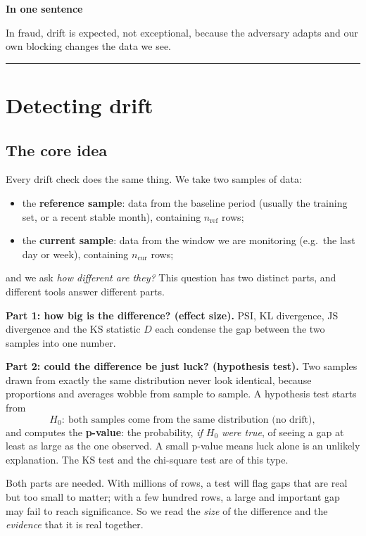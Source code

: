 \documentclass[11pt]{article}
\begin{document}
\textbf{In one sentence}

In fraud, drift is expected, not exceptional, because the adversary adapts and our own blocking changes the data we see.

\vspace{5mm}
\hrule
\vspace{5mm}

\section{Detecting drift}

\subsection{The core idea}

Every drift check does the same thing. We take two samples of data:
\begin{itemize}
    \item the \textbf{reference sample}: data from the baseline period (usually the training set, or a recent stable month), containing \(n_{\text{ref}}\) rows;
    \item the \textbf{current sample}: data from the window we are monitoring (e.g.\ the last day or week), containing \(n_{\text{cur}}\) rows;
\end{itemize}
and we ask \emph{how different are they?} This question has two distinct parts, and different tools answer different parts.

\textbf{Part 1: how big is the difference? (effect size).} PSI, KL divergence, JS divergence and the KS statistic \(D\) each condense the gap between the two samples into one number.

\textbf{Part 2: could the difference be just luck? (hypothesis test).} Two samples drawn from exactly the same distribution never look identical, because proportions and averages wobble from sample to sample. A hypothesis test starts from
\[
H_0:\ \text{both samples come from the same distribution (no drift)},
\]
and computes the \textbf{p-value}: the probability, \emph{if \(H_0\) were true}, of seeing a gap at least as large as the one observed. A small p-value means luck alone is an unlikely explanation. The KS test and the chi-square test are of this type.

Both parts are needed. With millions of rows, a test will flag gaps that are real but too small to matter; with a few hundred rows, a large and important gap may fail to reach significance. So we read the \emph{size} of the difference and the \emph{evidence} that it is real together.
\end{document}
